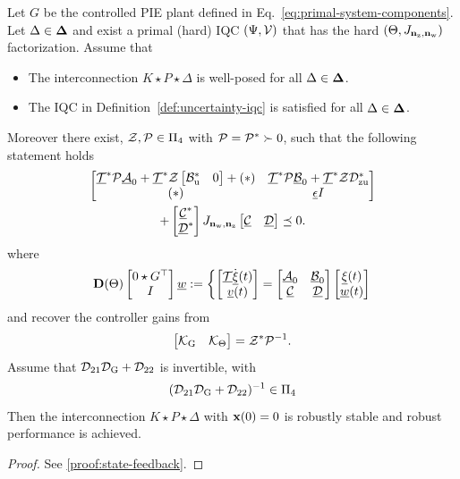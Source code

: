 \begin{corollary}\label{thm:state-feedback}
    Let $G$ be the controlled PIE plant defined in
    Eq.~\eqref{eq:primal-system-components}.
    Let $\Delta\in\mathbf{\Delta}$ and exist a primal (hard) IQC $(\Psi,\mathcal{V})$ that has the hard
    $(\Theta,J_{\mathbf{n}_{{\mathrm{z}}},\mathbf{n}_{{\mathrm{w}}}})$ factorization. Assume that
    \begin{itemize}
        \item The interconnection $K\star P\star\Delta$ is well-posed for all $\Delta\in\mathbf{\Delta}$.
        \item The IQC in Definition~\ref{def:uncertainty-iqc} is satisfied for all $\Delta\in\mathbf{\Delta}$.
    \end{itemize}
     Moreover there exist, $\mathcal{Z},\mathcal{P}\in\Pi_4$ with $\mathcal{P} = \mathcal{P}^* \succ 0$, such that the following statement holds
    \begin{equation}\label{eq:controller-kyp}
        \begin{gathered}
            \begin{bmatrix}
                \underline{\mathcal{T}}^*\mathcal{P}\underline{\mathcal{A}}_0
                +
                \underline{\mathcal{T}}^*\mathcal{Z}\begin{bmatrix}\mathcal{B}_{{\mathrm{u}}}^*&0\end{bmatrix}
                +(*)
                &
                \underline{\mathcal{T}}^*\mathcal{P}\underline{\mathcal{B}}_0
                +
                \underline{\mathcal{T}}^*\mathcal{Z}\mathcal{D}_{{\mathrm{zu}}}^*
                \\
                (*)&
                \underline\epsilon I
            \end{bmatrix}\\
                +\begin{bmatrix}\underline{\mathcal{C}}^*\\\underline{\mathcal{D}}^*\end{bmatrix}
                J_{\mathbf{n}_{{\mathrm{w}}},\mathbf{n}_{{\mathrm{z}}}}
                \begin{bmatrix}\underline{\mathcal{C}}&\underline{\mathcal{D}}\end{bmatrix}
                \preceq0.
        \end{gathered}
\end{equation}
where
\begin{equation}\label{eq:feedback-system}
\mathbf{D}(\Theta)\begin{bmatrix}0\star G^\top\\I\end{bmatrix}\underline{w}
:=
\left\{
\begin{bmatrix}
\underline{\mathcal{T}}\dot{\underline{\mathbf{\xi}}}(t)\\
{\underline{v}}(t)
\end{bmatrix}
=
\begin{bmatrix}
\underline{\mathcal{A}}_0 & \underline{\mathcal{B}}_0\\
\underline{\mathcal{C}} & \underline{\mathcal{D}}
\end{bmatrix}
\begin{bmatrix}
\underline{\mathbf{\xi}}(t)\\
\underline{w}(t)
\end{bmatrix}
\right.
\end{equation}
and recover the controller gains from
\[
\begin{bmatrix}\mathcal{K}_{{\mathrm{G}}}&\mathcal{K}_\Theta\end{bmatrix}=\mathcal{Z}^*\mathcal{P}^{-1}.
\]
Assume that $\mathcal{D}_{21}\mathcal{D}_{{\mathrm{G}}}+\mathcal{D}_{22}$ is invertible, with
\[
(\mathcal{D}_{21}\mathcal{D}_{{\mathrm{G}}}+\mathcal{D}_{22})^{-1}\in\Pi_4
\]
Then the interconnection $K\star P\star\Delta$ with $\mathbf{x}(0)=0$ is robustly stable and robust performance is achieved.
\end{corollary}
\begin{proof}
    See \ref{proof:state-feedback}.
\end{proof}

